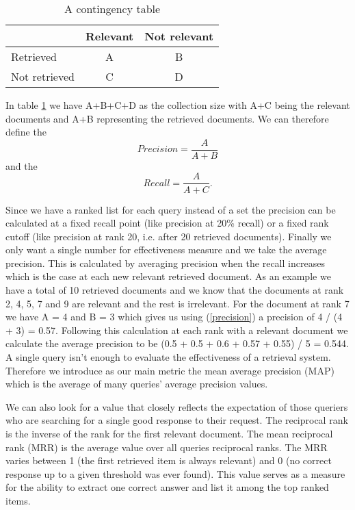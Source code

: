 \documentclass[journal]{IEEEtran}
\begin{document}
\begin{table}[h]
\caption{A contingency table}
\label{contTable}
\begin{center}
\begin{tabular}{ | l | c | c | }
	\hline
				& Relevant	& Not relevant	\\ \hline
	Retrieved		& A		& B			\\ \hline
	Not retrieved	& C		& D			\\
	\hline
\end{tabular}
\end{center}
\end{table}

In table \ref{contTable} we have A+B+C+D as the collection size with A+C being the relevant documents and A+B representing the retrieved documents.
We can therefore define the
\begin{equation}
\label{precision}
Precision = \frac{A}{A+B}
\end{equation}
and the
\begin{equation}
\label{recall}
Recall = \frac{A}{A+C}.
\end{equation}

Since we have a ranked list for each query instead of a set the precision can be calculated at a fixed recall point (like precision at 20\% recall) or a fixed rank cutoff (like precision at rank 20, i.e. after 20 retrieved documents).
Finally we only want a single number for effectiveness measure and we take the average precision.
This is calculated by averaging precision when the recall increases which is the case at each new relevant retrieved document.
As an example we have a total of 10 retrieved documents and we know that the documents at rank 2, 4, 5, 7 and 9 are relevant and the rest is irrelevant.
For the document at rank 7 we have A = 4 and B = 3 which gives us using (\ref{precision}) a precision of 4 / (4 + 3) = 0.57.
Following this calculation at each rank with a relevant document we calculate the average precision to be (0.5 + 0.5 + 0.6 + 0.57 + 0.55) / 5 = 0.544.
A single query isn't enough to evaluate the effectiveness of a retrieval system.
Therefore we introduce as our main metric the mean average precision (MAP) which is the average of many queries' average precision values.

We can also look for a value that closely reflects the expectation of those queriers who are searching for a single good response to their request.
The reciprocal rank is the inverse of the rank for the first relevant document.
The mean reciprocal rank (MRR) is the average value over all queries reciprocal ranks.
The MRR varies between 1 (the first retrieved item is always relevant) and 0 (no correct response up to a given threshold was ever found).
This value serves as a measure for the ability to extract one correct answer and list it among the top ranked items.
\end{document}
